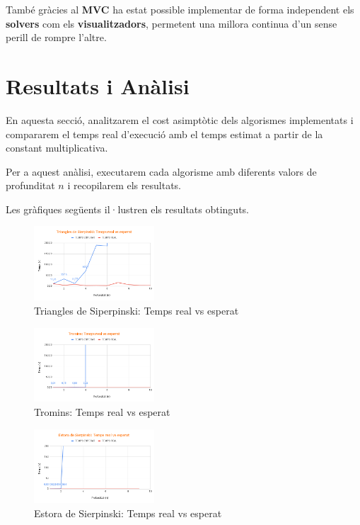 \documentclass{ieeetj}
\begin{document}
També gràcies al \textbf{MVC} ha estat possible implementar de forma independent els \textbf{solvers} com els \textbf{visualitzadors}, permetent una millora continua d'un sense perill de rompre l'altre.

\section{Resultats i Anàlisi}
En aquesta secció, analitzarem el cost asimptòtic dels algorismes implementats i compararem el temps real d'execució amb el temps estimat a partir de la constant multiplicativa.  

Per a aquest anàlisi, executarem cada algorisme amb diferents valors de profunditat \( n \) i recopilarem els resultats.  

Les gràfiques següents il·lustren els resultats obtinguts.
\begin{figure}[h]
\centerline{\includegraphics[width=0.4\textwidth]{docs/png/Triangles de Sierpinski_ Temps real vs esperat.png}}
\caption{Triangles de Siperpinski: Temps real vs esperat}
\label{fig:int2}
\end{figure}
\begin{figure}[H]
\centerline{\includegraphics[width=0.4\textwidth]{docs/png/Tromins_ Temps real vs esperat.png}}
\caption{Tromins: Temps real vs esperat}
\label{fig:int2}
\end{figure}
\begin{figure}[H]
\centerline{\includegraphics[width=0.4\textwidth]{docs/png/Estora de Sierpinski_ Temps real vs esperat.png}}
\caption{Estora de Sierpinski: Temps real vs esperat}
\label{fig:int2}
\end{figure}
\end{document}
